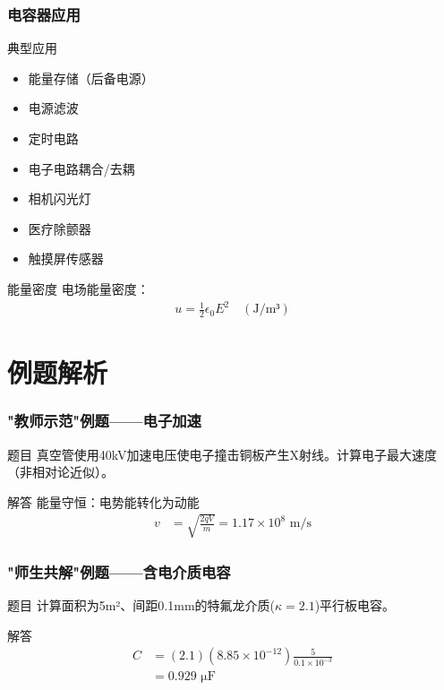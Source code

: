 \documentclass{beamer}
\begin{document}
\begin{frame}
    \frametitle{电容器应用}
    
    \begin{block}{典型应用}
        \begin{itemize}
            \item 能量存储（后备电源）
            \item 电源滤波
            \item 定时电路
            \item 电子电路耦合/去耦
            \item 相机闪光灯
            \item 医疗除颤器
            \item 触摸屏传感器
        \end{itemize}
    \end{block}
    
    \begin{block}{能量密度}
        电场能量密度：
        \begin{align}
            u = \frac{1}{2}\epsilon_0 E^2 \quad (\text{J/m³})
        \end{align}
    \end{block}
\end{frame}

\section{例题解析}

\begin{frame}
    \frametitle{"教师示范"例题——电子加速}
    
    \begin{block}{题目}
        真空管使用40kV加速电压使电子撞击铜板产生X射线。计算电子最大速度（非相对论近似）。
    \end{block}
    
    \begin{block}{解答}
        能量守恒：电势能转化为动能
        \begin{align}
            v &= \sqrt{\frac{2qV}{m}} = 1.17 \times 10^8 \text{ m/s}
        \end{align}
    \end{block}
\end{frame}

\begin{frame}
    \frametitle{"师生共解"例题——含电介质电容}
    
    \begin{block}{题目}
        计算面积为5m²、间距0.1mm的特氟龙介质($\kappa=2.1$)平行板电容。
    \end{block}
    
    \begin{block}{解答}
        \begin{align}
            C &= (2.1)(8.85 \times 10^{-12})\frac{5}{0.1 \times 10^{-3}} \\
            &= 0.929 \text{ μF}
        \end{align}
    \end{block}
\end{frame}
\end{document}
